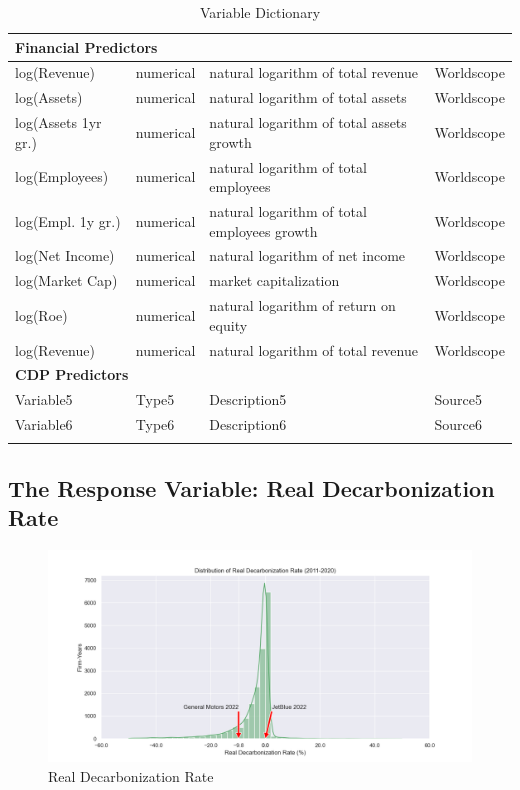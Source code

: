 \begin{longtable}{lp{2cm}p{6cm}p{2cm}}
    \midrule
    \multicolumn{4}{l}{\textbf{Financial Predictors}} \\
    \midrule
    log(Revenue) & numerical & natural logarithm of total revenue & Worldscope \\
    log(Assets) & numerical & natural logarithm of total assets & Worldscope \\
    log(Assets 1yr gr.) & numerical & natural logarithm of total assets growth & Worldscope \\
    log(Employees) & numerical & natural logarithm of total employees & Worldscope \\
    log(Empl. 1y gr.) & numerical & natural logarithm of total employees growth & Worldscope \\
    log(Net Income) & numerical & natural logarithm of net income & Worldscope \\
    log(Market Cap) & numerical & market capitalization & Worldscope \\
    log(Roe) & numerical & natural logarithm of return on equity & Worldscope \\
    log(Revenue) & numerical & natural logarithm of total revenue & Worldscope \\
    \midrule
    \multicolumn{4}{l}{\textbf{CDP Predictors}} \\
    \midrule
    Variable5 & Type5 & Description5 & Source5 \\
    Variable6 & Type6 & Description6 & Source6 \\
    
    \bottomrule
\caption{Variable Dictionary}
\label{tab:variable-dictionary}
\end{longtable}

\subsection{The Response Variable: Real Decarbonization Rate}

\begin{figure}[H]
    \begin{center}
    \includegraphics[width=5in]{figures/ghg_change_real_dist.png}
    \caption{Real Decarbonization Rate}
    \label{fig:real-decarbonization-rate}
    \end{center}
\end{figure}

